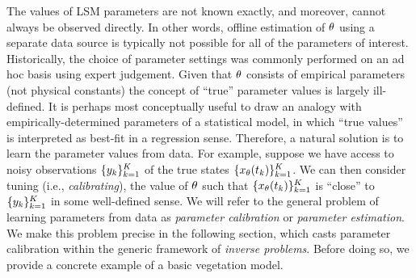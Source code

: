 \documentclass[12pt]{article}
\begin{document}
The values of LSM parameters are not known exactly, and moreover, cannot always be observed directly. In other words, offline estimation of $\theta$
using a separate data source is typically not possible for all of the parameters of interest. Historically, the choice of parameter settings 
was commonly performed on an ad hoc basis using expert judgement. 
Given that $\theta$ consists of empirical parameters 
(not physical constants) the concept of ``true'' parameter values is largely ill-defined. It is perhaps most conceptually useful to draw an 
analogy with empirically-determined parameters of a statistical model, in which ``true values'' is interpreted as best-fit in a regression sense.
Therefore, a natural solution is to learn the parameter values from data. For example, suppose we have access to noisy observations 
$\{{y}_{k}\}_{k=1}^{K}$ of the true states 
$\{x_{\theta}({t}_{k})\}_{k=1}^{K}$. 
We can then consider tuning (i.e., \textit{calibrating}), the value of $\theta$ such that $\{x_{\theta}({t}_{k})\}_{k=1}^{K}$
is ``close'' to $\{{y}_{k}\}_{k=1}^{K}$  in some well-defined sense. We will refer to the 
general problem of learning parameters from data as \textit{parameter calibration} or \textit{parameter estimation}. We make this 
problem precise in the following section, which casts parameter calibration within the generic framework of \textit{inverse problems}. Before 
doing so, we provide a concrete example of a basic vegetation model. 

\end{document}
